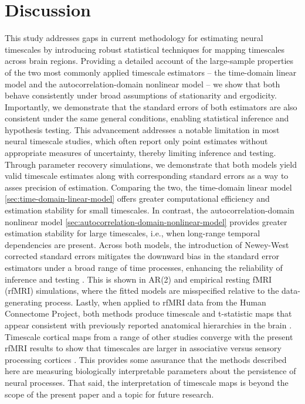 \documentclass[latex/main.tex]{subfiles}
\begin{document}
\section{Discussion}

This study addresses gaps in current methodology for estimating neural timescales by introducing robust statistical techniques for mapping timescales across brain regions. Providing a detailed account of the large-sample properties of the two most commonly applied timescale estimators -- the time-domain linear model and the autocorrelation-domain nonlinear model -- we show that both behave consistently under broad assumptions of stationarity and ergodicity. Importantly, we demonstrate that the standard errors of both estimators are also consistent under the same general conditions, enabling statistical inference and hypothesis testing. This advancement addresses a notable limitation in most neural timescale studies, which often report only point estimates without appropriate measures of uncertainty, thereby limiting inference and testing.\\

Through parameter recovery simulations, we demonstrate that both models yield valid timescale estimates along with corresponding standard errors as a way to asses precision of estimation. Comparing the two, the time-domain linear model \ref{sec:time-domain-linear-model} offers greater computational efficiency and estimation stability for small timescales. In contrast, the autocorrelation-domain nonlinear model \ref{sec:autocorrelation-domain-nonlinear-model} provides greater estimation stability for large timescales, i.e., when long-range temporal dependencies are present. Across both models, the introduction of Newey-West corrected standard errors mitigates the downward bias in the standard error estimators under a broad range of time processes, enhancing the reliability of inference and testing \citep{newey_simple_1987}. This is shown in AR(2) and empirical resting fMRI (rfMRI) simulations, where the fitted models are misspecified relative to the data-generating process. Lastly, when applied to rfMRI data from the Human Connectome Project, both methods produce timescale and t-statistic maps that appear consistent with previously reported anatomical hierarchies in the brain \citep{van_essen_wu-minn_2013}. Timescale cortical maps from a range of other studies converge with the present rfMRI results to show that timescales are larger in associative versus sensory processing cortices \citep{raut_hierarchical_2020, shafiei_topographic_2020, lurie_cortical_2024, mitra_lag_2014, kaneoke_variance_2012, wengler_distinct_2020, shinn_functional_2023, manea_intrinsic_2022, ito_cortical_2020, muller_core_2020}. This provides some assurance that the methods described here are measuring biologically interpretable parameters about the persistence of neural processes. That said, the interpretation of timescale maps is beyond the scope of the present paper and a topic for future research.\\
\end{document}
